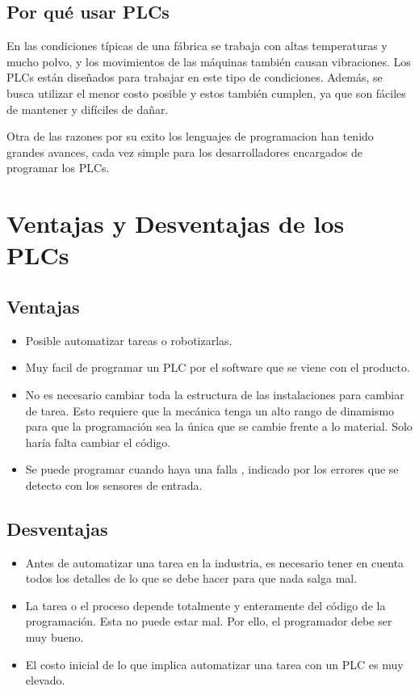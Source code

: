 \documentclass[12pt]{report}
\begin{document}
\subsection{Por qué usar PLCs}
En las condiciones típicas de una fábrica se trabaja con altas temperaturas y mucho polvo, y los movimientos de las máquinas también causan vibraciones. Los PLCs están diseñados para trabajar en este tipo de condiciones. Además, se busca utilizar el menor costo posible y estos también cumplen, ya que son fáciles de mantener y difíciles de dañar.

Otra de las razones por su exito los lenguajes de programacion han tenido grandes avances, cada vez simple para los desarrolladores encargados de programar los PLCs. \cite{Autycom2019}
\section{Ventajas y Desventajas de los PLCs}
\subsection{Ventajas}
\begin{itemize}
\item Posible automatizar tareas o robotizarlas.
\item Muy facil de programar un PLC por el software que se viene con el producto.
\item No es necesario cambiar toda la estructura de las instalaciones para cambiar de tarea. Esto requiere que la mecánica tenga un alto rango de dinamismo para que la programación sea la única que se cambie frente a lo material. Solo haría falta cambiar el código.
\item Se puede programar cuando haya una falla , indicado por los errores que se detecto con los sensores de entrada.
\end{itemize}


  \subsection{Desventajas}
  \begin{itemize}
  \item Antes de automatizar una tarea en la industria, es necesario tener en cuenta todos los detalles de lo que se debe hacer para que nada salga mal.
  \item La tarea o el proceso depende totalmente y enteramente del código de la programación. Esta no puede estar mal. Por ello, el programador debe ser muy bueno.
  \item El costo inicial de lo que implica automatizar una tarea con un PLC es muy elevado. \cite{VentajasDesventajasPLC}
  \end{itemize}
\newpage
\end{document}
